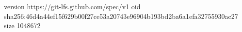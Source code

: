 version https://git-lfs.github.com/spec/v1
oid sha256:46d4a44ef15f629b00f27ce53a20743e96904b193bd2ba6a1efa32755930ac27
size 1048672
